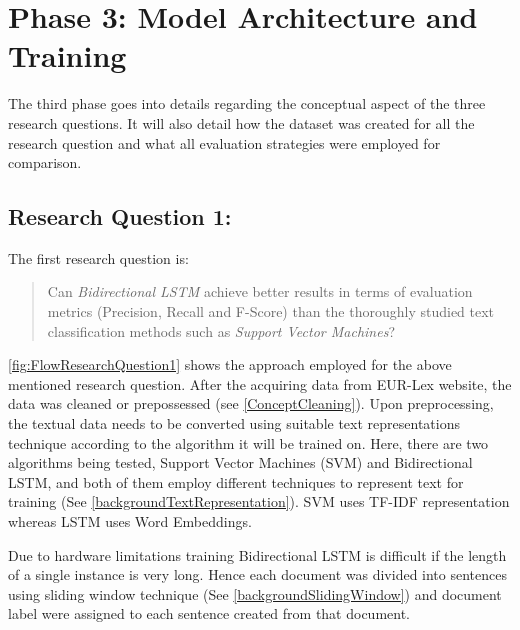 \section{Phase 3: Model Architecture and Training}\label{sec:conceptRQ}
The third phase goes into details regarding the conceptual aspect of the three research questions. It will also detail how the dataset was created for all the research question and what all evaluation strategies were employed for comparison. 

\subsection{Research Question 1:} \label{question1}
The first research question is:
\begin{quote}
    Can \textit{Bidirectional LSTM} achieve better results in terms of evaluation metrics (Precision, Recall and F-Score) than the thoroughly studied text classification methods such as \textit{Support Vector Machines}?
\end{quote}

\ref{fig:FlowResearchQuestion1} shows the approach employed for the above mentioned research question. After the acquiring data from EUR-Lex website, the data was cleaned or prepossessed (see \ref{ConceptCleaning}). Upon preprocessing, the textual data needs to be converted using suitable text representations technique according to the algorithm it will be trained on. Here, there are two algorithms being tested, Support Vector Machines (SVM) and Bidirectional LSTM, and both of them employ different techniques to represent text for training (See \ref{backgroundTextRepresentation}). SVM uses TF-IDF representation whereas LSTM uses Word Embeddings. 
 
Due to hardware limitations training Bidirectional LSTM is difficult if the length of a single instance is very long. Hence each document was divided into sentences using sliding window technique (See \ref{backgroundSlidingWindow}) and document label were assigned to each sentence created from that document. 

